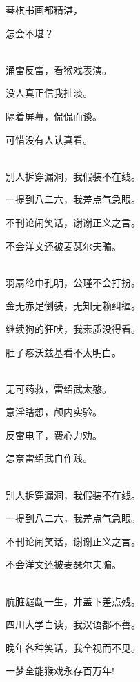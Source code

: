 \documentclass[UTF8,12pt,oneside]{ctexbook}
\begin{document}
\begin{center}
            琴棋书画都精湛，
            
            怎会不堪？
            
            ~\\
            涌雷反雷，看猴戏表演。
            
            没人真正信我扯淡。
            
            隔着屏幕，侃侃而谈。
            
            可惜没有人认真看。
            
            ~\\
            别人拆穿漏洞，我假装不在线。
            
            一提到八二六，我差点气急眼。
            
            不刊论闹笑话，谢谢正义之言。
            
            不会洋文还被麦瑟尔夫骗。
            
            ~\\
            羽扇纶巾孔明，公瑾不会打扮。
            
            金无赤足倒装，无知无赖纠缠。
            
            继续狗的狂吠，我素质没得看。
            
            肚子疼沃兹基看不太明白。
            
            ~\\
            无可药救，雷绍武太憨。
            
            意淫瞎想，颅内实验。
            
            反雷电子，费心力劝。
            
            怎奈雷绍武自作贱。
            
            ~\\
            别人拆穿漏洞，我假装不在线。
            
            一提到八二六，我差点气急眼。
            
            不刊论闹笑话，谢谢正义之言。
            
            不会洋文还被麦瑟尔夫骗。
            
            ~\\
            肮脏龌龊一生，井盖下差点残。
            
            四川大学白读，我汉语都不善。
            
            晚年各种笑话，我全视而不见。
            
            一梦全能猴戏永存百万年!
        \end{center}
        
\end{document}
